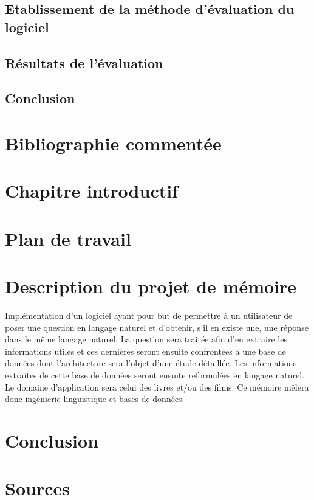 \documentclass[11pt]{article}
\begin{document}
\subsection{Etablissement de la méthode d'évaluation du logiciel}
\subsection{Résultats de l'évaluation}
\subsection{Conclusion}


\section{Bibliographie commentée}

\section{Chapitre introductif}

\section{Plan de travail}

\section{Description du projet de mémoire}
Implémentation d’un logiciel ayant pour but de permettre  à un utilisateur de poser une question en langage naturel et d’obtenir, s’il en existe une, une réponse dans le même langage naturel. La question sera traitée afin d’en extraire les informations utiles et ces dernières seront ensuite confrontées à une base de données dont l’architecture sera l’objet d’une étude détaillée. Les informations extraites de cette base de données seront ensuite reformulées en langage naturel. Le domaine d’application sera celui des livres et/ou des films. Ce mémoire mêlera donc ingénierie linguistique et bases de données.

\section{Conclusion}

\newpage
\section{Sources}
\nocite{*}
\printbibliography
\end{document}
